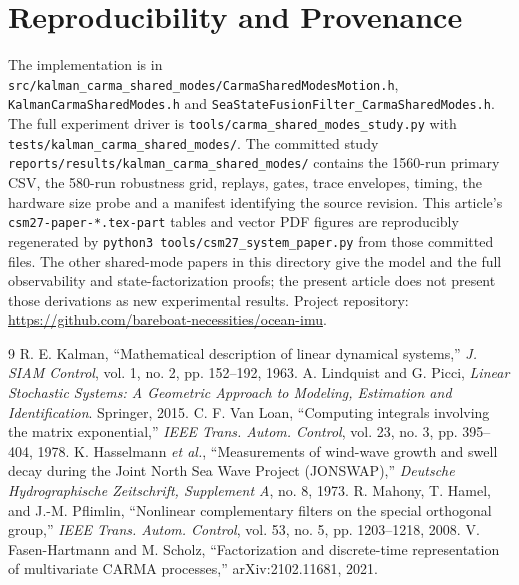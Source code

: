 \documentclass[conference]{IEEEtran}
\begin{document}
\section*{Reproducibility and Provenance}
The implementation is in
\texttt{src/kalman\_carma\_shared\_modes/CarmaSharedModesMotion.h},
\texttt{KalmanCarmaSharedModes.h} and
\texttt{SeaStateFusionFilter\_CarmaSharedModes.h}.
The full experiment driver is
\texttt{tools/carma\_shared\_modes\_study.py} with
\texttt{tests/kalman\_carma\_shared\_modes/}. The committed study
\texttt{reports/results/kalman\_carma\_shared\_modes/}
contains the 1560-run primary CSV, the 580-run robustness grid, replays,
gates, trace envelopes, timing, the hardware size probe and a manifest
identifying the source revision. This article's
\texttt{csm27-paper-*.tex-part} tables and vector PDF figures are
reproducibly regenerated by
\texttt{python3 tools/csm27\_system\_paper.py} from those committed
files. The other shared-mode papers in this directory give the model and
the full observability and state-factorization proofs; the present article
does not present those derivations as new experimental results. Project repository:
\url{https://github.com/bareboat-necessities/ocean-imu}.

\begin{thebibliography}{9}
R. E. Kalman, ``Mathematical description of linear dynamical systems,''
\emph{J. SIAM Control}, vol. 1, no. 2, pp. 152--192, 1963.
A. Lindquist and G. Picci, \emph{Linear Stochastic Systems: A Geometric
Approach to Modeling, Estimation and Identification}. Springer, 2015.
C. F. Van Loan, ``Computing integrals involving the matrix exponential,''
\emph{IEEE Trans. Autom. Control}, vol. 23, no. 3, pp. 395--404, 1978.
K. Hasselmann \emph{et al.}, ``Measurements of wind-wave growth and swell
decay during the Joint North Sea Wave Project (JONSWAP),''
\emph{Deutsche Hydrographische Zeitschrift, Supplement A}, no. 8, 1973.
R. Mahony, T. Hamel, and J.-M. Pflimlin, ``Nonlinear complementary filters
on the special orthogonal group,'' \emph{IEEE Trans. Autom. Control},
vol. 53, no. 5, pp. 1203--1218, 2008.
V. Fasen-Hartmann and M. Scholz, ``Factorization and discrete-time
representation of multivariate CARMA processes,'' arXiv:2102.11681, 2021.
\end{thebibliography}
\end{document}
